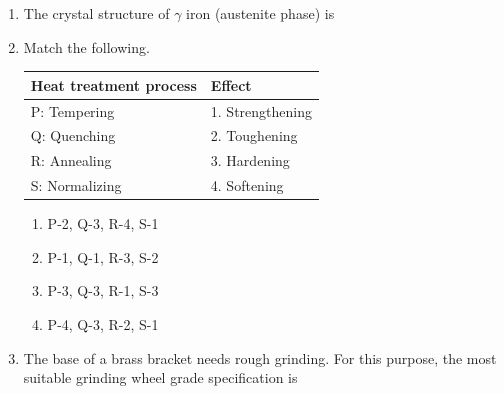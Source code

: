 \documentclass[12pt,onecolumn]{article}
\begin{document}
\begin{enumerate}
    \item The crystal structure of $\gamma$ iron (austenite phase) is
          \begin{enumerate}
          \end{enumerate}

    \item Match the following.
          \begin{table}[H]
              \centering\large
              \begin{tabular}{|l|l|}
                  \hline
                  \textbf{Heat treatment process} & \textbf{Effect}  \\
                  \hline
                  P: Tempering                    & 1. Strengthening \\\hline
                  Q: Quenching                    & 2. Toughening    \\\hline
                  R: Annealing                    & 3. Hardening     \\\hline
                  S: Normalizing                  & 4. Softening     \\\hline
              \end{tabular}
              \label{tab:q11}
          \end{table}
          \begin{enumerate}
              \item P-2, Q-3, R-4, S-1
              \item P-1, Q-1, R-3, S-2
              \item P-3, Q-3, R-1, S-3
              \item P-4, Q-3, R-2, S-1
          \end{enumerate}

    \item The base of a brass bracket needs rough grinding. For this purpose, the most suitable grinding wheel grade specification is
          \begin{enumerate}
          \end{enumerate}


\end{enumerate}
\end{document}
